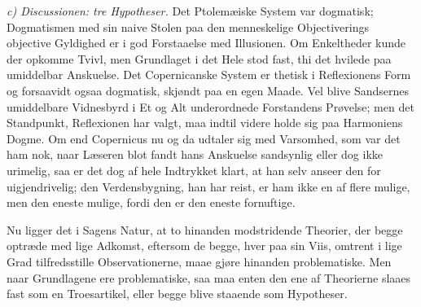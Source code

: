 \documentclass[12pt,a4paper]{book}
\newcommand{\runin}[1]{\emph{#1}\hspace{0.4em}}
\begin{document}
\runin{c) Discussionen: tre Hypotheser.} Det Ptolemæiske System var
dogmatisk; Dogmatismen med sin naive Stolen
paa den menneskelige Objectiverings objective Gyldighed er i god
Forstaaelse med Illusionen. Om Enkeltheder kunde der opkomme Tvivl, men
Grundlaget i det Hele stod fast, thi det hvilede paa umiddelbar
Anskuelse. Det Copernicanske System er thetisk i Reflexionens Form og
forsaavidt ogsaa dogmatisk, skjøndt paa en egen Maade. Vel blive
Sandsernes umiddelbare Vidnesbyrd i Et og Alt underordnede Forstandens
Prøvelse; men det Standpunkt, Reflexionen har valgt, maa indtil videre
holde sig paa Harmoniens Dogme. Om end Copernicus nu og da udtaler sig
med Varsomhed, som var det ham nok, naar Læseren blot fandt hans
Anskuelse sandsynlig eller dog ikke urimelig, saa er det dog af hele
Indtrykket klart, at han selv anseer den for uigjendrivelig; den
Verdensbygning, han har reist, er ham ikke en af flere mulige, men den
eneste mulige, fordi den er den eneste fornuftige.

Nu ligger det i Sagens Natur, at to hinanden modstridende Theorier, der
begge optræde med lige Adkomst, eftersom de begge, hver paa sin Viis,
omtrent i lige Grad tilfredsstille Observationerne, maae gjøre hinanden
problematiske. Men naar Grundlagene ere problematiske, saa maa enten
den ene af Theorierne slaaes fast som en Troesartikel, eller begge
blive staaende som Hypotheser.
\end{document}

